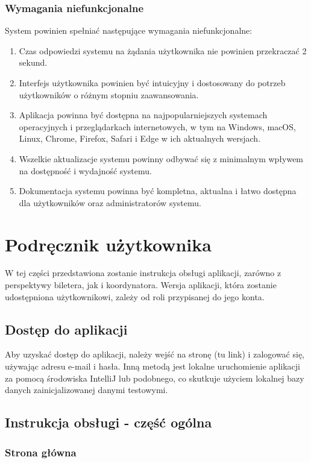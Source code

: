 \documentclass[shortabstract]{iithesis}
\begin{document}
\subsection{Wymagania niefunkcjonalne}
System powinien spełniać następujące wymagania niefunkcjonalne:
\begin{enumerate}
  \item Czas odpowiedzi systemu na żądania użytkownika nie powinien przekraczać 2 sekund.
  \item Interfejs użytkownika powinien być intuicyjny i dostosowany do potrzeb użytkowników o różnym stopniu zaawansowania.
  \item Aplikacja powinna być dostępna na najpopularniejszych systemach operacyjnych i przeglądarkach internetowych, w tym na Windows, macOS, Linux, Chrome, Firefox, Safari i Edge w ich aktualnych wersjach.
  \item Wszelkie aktualizacje systemu powinny odbywać się z minimalnym wpływem na dostępność i wydajność systemu.
  \item Dokumentacja systemu powinna być kompletna, aktualna i łatwo dostępna dla użytkowników oraz administratorów systemu.
\end{enumerate}

\chapter{Podręcznik użytkownika}

W tej części przedstawiona zostanie instrukcja obsługi aplikacji, zarówno z perspektywy biletera, jak i koordynatora. Wersja aplikacji, która zostanie udostępniona użytkownikowi, zależy od roli przypisanej do jego konta.

\section{Dostęp do aplikacji}
Aby uzyskać dostęp do aplikacji, należy wejść na stronę (tu link) i zalogować się, używając adresu e-mail i hasła. Inną metodą jest lokalne uruchomienie aplikacji za pomocą środowiska IntelliJ lub podobnego, co skutkuje użyciem lokalnej bazy danych zainicjalizowanej danymi testowymi.

\section{Instrukcja obsługi - część ogólna}

\subsection{Strona główna}
\end{document}
